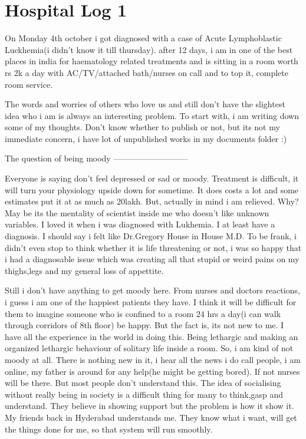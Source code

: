 \section*{Hospital Log 1}
\vskip 2pt

On Monday 4th october i got diagnosed with a case of Acute Lymphoblastic Luckhemia(i didn't know it till thursday). after 12 days, i am in one of the best places in india for haematology related treatments and is sitting in a room worth rs 2k a day with AC/TV/attached bath/nurses on call and to top it, complete room service.

The words and worries of others who love us and still don't have the slightest idea who i am is always an interesting problem. To start with, i am writing down some of my thoughts. Don't know whether to publish or not, but its not my immediate concern, i have lot of unpublished works in my documents folder :)

The question of being moody
---------------------------

Everyone is saying don't feel depressed or sad or moody. Treatment is difficult, it will turn your physiology upside down for sometime. It does costs a lot and some estimates put it at as much as 20lakh. But, actually in mind i am relieved. Why? May be its the mentality of scientist inside me who doesn't like unknown variables. I loved it when i was diagnosed with Lukhemia. I at least have a diagnosis. I should say i felt like Dr.Gregory House in House M.D. To be frank, i didn't even stop to think whether it is life threatening or not, i was so happy that i had a diagnosable issue which was creating all that stupid or weird pains on my thighs,legs and my general loss of appettite.

Still i don't have anything to get moody here. From nurses and doctors reactions, i guess i am one of the happiest patients they have. I think it will be difficult for them to imagine someone who is confined to a room 24 hrs a day(i can walk through corridors of 8th floor) be happy. But the fact is, its not new to me. I have all the experience in the world in doing this. Being lethargic and making an organized lethargic behaviour of solitary life inside a room. So, i am kind of not moody at all. There is nothing new in it, i hear all the news i do call people, i am online, my father is around for any help(he might be getting bored). If not nurses will be there. But most people don't understand this. The idea of socialising without really being in society is a difficult thing for many to think,gasp and understand. They believe in showing support but the problem is how it show it. My friends back in Hyderabad understands me. They know what i want, will get the things done for me, so that system will run smoothly. 

